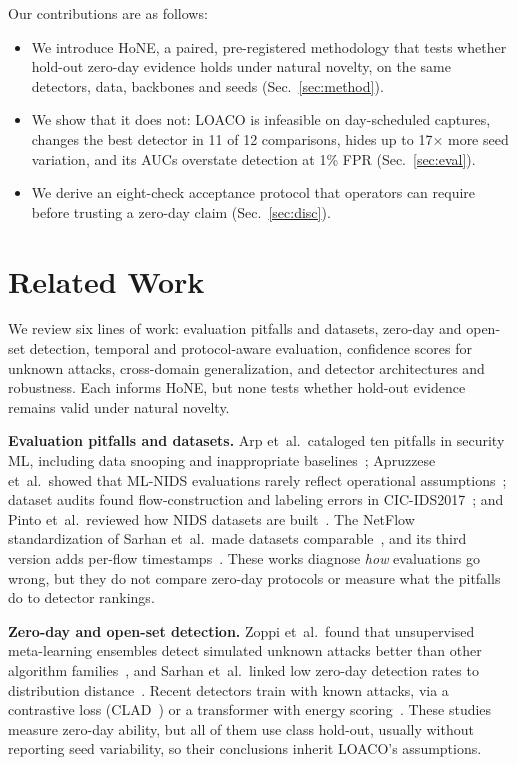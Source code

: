 \documentclass[conference]{IEEEtran}
\begin{document}
Our contributions are as follows:
\begin{itemize}
\item We introduce HoNE, a paired, pre-registered methodology that tests whether hold-out zero-day evidence holds under natural novelty, on the same detectors, data, backbones and seeds (Sec.~\ref{sec:method}).
\item We show that it does not: LOACO is infeasible on day-scheduled captures, changes the best detector in 11 of 12 comparisons, hides up to 17$\times$ more seed variation, and its AUCs overstate detection at 1\% FPR (Sec.~\ref{sec:eval}).
\item We derive an eight-check acceptance protocol that operators can require before trusting a zero-day claim (Sec.~\ref{sec:disc}).
\end{itemize}

\section{Related Work}
\label{sec:related}

We review six lines of work: evaluation pitfalls and datasets, zero-day and open-set detection, temporal and protocol-aware evaluation, confidence scores for unknown attacks, cross-domain generalization, and detector architectures and robustness. Each informs HoNE, but none tests whether hold-out evidence remains valid under natural novelty.

\textbf{Evaluation pitfalls and datasets.} Arp et~al.\ cataloged ten pitfalls in security ML, including data snooping and inappropriate baselines~\cite{arp2022}; Apruzzese et~al.\ showed that ML-NIDS evaluations rarely reflect operational assumptions~\cite{apruzzese2023sok}; dataset audits found flow-construction and labeling errors in CIC-IDS2017~\cite{engelen2021,rosay2021}; and Pinto et~al.\ reviewed how NIDS datasets are built~\cite{pinto2025}. The NetFlow standardization of Sarhan et~al.\ made datasets comparable~\cite{sarhan2021netflow,sarhan2022standard}, and its third version adds per-flow timestamps~\cite{luay2025}. These works diagnose \emph{how} evaluations go wrong, but they do not compare zero-day protocols or measure what the pitfalls do to detector rankings.

\textbf{Zero-day and open-set detection.} Zoppi et~al.\ found that unsupervised meta-learning ensembles detect simulated unknown attacks better than other algorithm families~\cite{zoppi2023}, and Sarhan et~al.\ linked low zero-day detection rates to distribution distance~\cite{sarhan2023zeroshot}. Recent detectors train with known attacks, via a contrastive loss (CLAD~\cite{wilkie2026}) or a transformer with energy scoring~\cite{jodayree2026}. These studies measure zero-day ability, but all of them use class hold-out, usually without reporting seed variability, so their conclusions inherit LOACO's assumptions.
\end{document}

